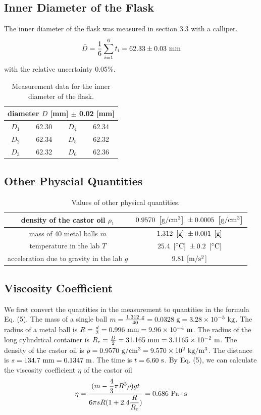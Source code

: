 \documentclass[a4paper]{report}
\begin{document}
	\subsection{Inner Diameter of the Flask}
	The inner diameter of the flask was measured in section 3.3 with a calliper.
	\begin{equation*}
	\bar{D}=\dfrac{1}{6}\sum_{i=1}^{6}t_i=62.33\pm0.03\ \rm{mm}
	\end{equation*}
	with the relative uncertainty 0.05\%.
	\begin{table}[H]
		\centering
		\begin{tabular}{|c|c|c|c|}
			\hline
			\multicolumn{4}{|c|}{diameter $D$ [mm] $\pm$ 0.02 [mm]}\\
			\hline
			$D_1$&62.30&$D_4$&62.34\\
			\hline
			$D_2$&62.34&$D_5$&62.32\\
				\hline
			$D_3$&62.32&$D_6$&62.36\\
			\hline
		\end{tabular}
		\caption{Measurement data for the inner diameter of the flask.}
	\end{table}
	\subsection{Other Physcial Quantities}
	\begin{table}[H]
		\centering
		\begin{tabular}{|c|c|}
			\hline
			density of the castor oil $\rho_1$&$0.9570\ \left[\rm{g/{cm}^3}\right]\ \pm 0.0005\ \left[\rm{g/{cm}^3}\right]$\\
			\hline
			mass of 40 metal balls $m$&$1.312\ \left[\rm{g}\right]\ \pm 0.001\ \left[\rm{g}\right]$\\
			\hline
			temperature in the lab $T$&$25.4\ \left[\rm{^\circ C}\right]\ \pm 0.2\ \left[\rm{^\circ C}\right]$\\
			\hline
			acceleration due to gravity in the lab $g$&9.81 [$\rm{m/s^2}$]\\
			\hline
		\end{tabular}
	\caption{Values of other physical quantities.}
	\end{table}
	\subsection{Viscosity Coefficient}
	We first convert the quantities in the measurement to quantities in the formula Eq. (5). The mass of a single ball $m=\frac{1.312\ \rm{g}}{40}=0.0328\ \rm{g}=3.28\times10^{-5}\ \rm{kg}$. The radius of a metal ball is $R=\frac{d}{2}=0.996\ \rm{mm}=9.96\times10^{-4}\ \rm{m}$. The radius of the long cylindrical container is $R_c=\frac{D}{2}=31.165\ \rm{mm}=3.1165\times10^{-2}\ \rm{m}$. The density of the castor oil is $\rho=0.9570\ \rm{g/{cm}^3}=9.570\times10^2\ \rm{kg/m^3}$. The distance is $s=134.7\ \rm{mm}=0.1347\ \rm{m}$. The time is $t=6.60\ \rm{s}$.
	By Eq. (5), we can calculate the viscosity coefficient $\eta$ of the castor oil
	\begin{equation*}
	\eta=\dfrac{(m-\dfrac{4}{3}\pi R^3\rho)gt}{6\pi sR(1+2.4\dfrac{R}{R_c})}=0.686\ \rm{Pa\cdot s}
	\end{equation*}
\end{document}
